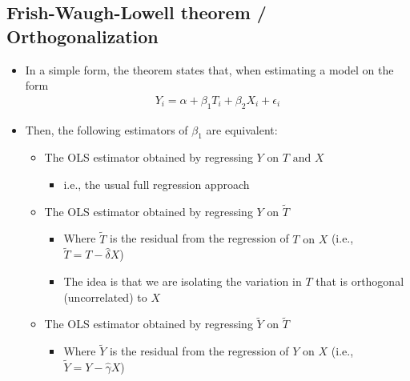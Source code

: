 \documentclass[10pt]{article}
\begin{document}
\subsection{Frish-Waugh-Lowell theorem / Orthogonalization}
\begin{itemize}
    \item In a simple form, the theorem states that, when estimating a model on the form 
    \begin{gather*}
        Y_i = \alpha + \beta_1T_i + \beta_2X_i + \epsilon_i
    \end{gather*}
    \item Then, the following estimators of $\beta_1 $ are equivalent:
    \begin{itemize}
        \item The OLS estimator obtained by regressing $Y \text{ on } T \text{ and } X $
        \begin{itemize}
            \item i.e., the usual full regression approach 
        \end{itemize}
        \item The OLS estimator obtained by regressing $Y\text{ on } \tilde{T} $
        \begin{itemize}
            \item Where $\tilde{T} $ is the residual from the regression of $T \text{ on } X $ (i.e., $\tilde{T} = T - \hat{\delta}X $)
            \item The idea is that we are isolating the variation in $T $ that is orthogonal (uncorrelated) to $X $
        \end{itemize}
        \item The OLS estimator obtained by regressing $\tilde{Y}\text{ on } \tilde{T} $
        \begin{itemize}
            \item Where $\tilde{Y} $ is the residual from the regression of $Y\text{ on } X $ (i.e., $\tilde{Y} = Y - \hat{\gamma}X $)
        \end{itemize}
    \end{itemize}
\end{itemize}
\newpage 
\end{document}
